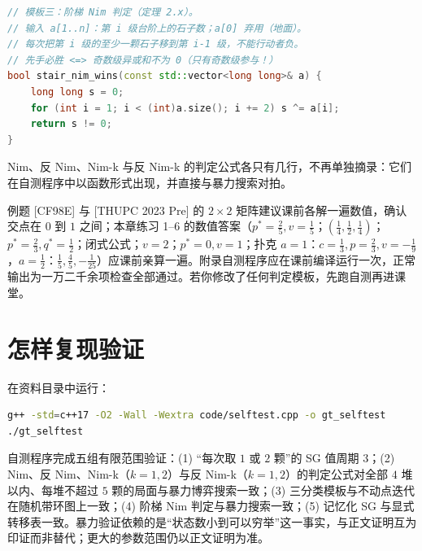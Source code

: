 \documentclass[UTF8,a4paper,11pt,oneside,openany,fontset=fandol]{ctexbook}
\theoremstyle{definition}
\begin{document}
\begin{lstlisting}[language=C++]
// 模板三：阶梯 Nim 判定（定理 2.x）。
// 输入 a[1..n]：第 i 级台阶上的石子数；a[0] 弃用（地面）。
// 每次把第 i 级的至少一颗石子移到第 i-1 级，不能行动者负。
// 先手必胜 <=> 奇数级异或和不为 0（只有奇数级参与！）
bool stair_nim_wins(const std::vector<long long>& a) {
    long long s = 0;
    for (int i = 1; i < (int)a.size(); i += 2) s ^= a[i];
    return s != 0;
}
\end{lstlisting}

Nim、反 Nim、Nim-k 与反 Nim-k 的判定公式各只有几行，不再单独摘录：它们在自测程序中以函数形式出现，并直接与暴力搜索对拍。

\begin{teach}[备课验证]
例题 [CF98E] 与 [THUPC 2023 Pre] 的 $2\times2$ 矩阵建议课前各解一遍数值，确认交点在 $0$ 到 $1$ 之间；本章练习 1--6 的数值答案（$p^{*}=\tfrac25,v=\tfrac15$；$(\tfrac14,\tfrac12,\tfrac14)$；$p^{*}=\tfrac23,q^{*}=\tfrac12$；闭式公式；$v=2$；$p^{*}=0,v=1$；扑克 $a=1$：$c=\tfrac13,p=\tfrac23,v=-\tfrac19$，$a=\tfrac12$：$\tfrac15,\tfrac45,-\tfrac1{25}$）应课前亲算一遍。附录自测程序应在课前编译运行一次，正常输出为一万二千余项检查全部通过。若你修改了任何判定模板，先跑自测再进课堂。
\end{teach}
\section{怎样复现验证}
在资料目录中运行：
\begin{lstlisting}[language=bash]
g++ -std=c++17 -O2 -Wall -Wextra code/selftest.cpp -o gt_selftest
./gt_selftest
\end{lstlisting}
自测程序完成五组有限范围验证：(1) “每次取 $1$ 或 $2$ 颗”的 SG 值周期 $3$；(2) Nim、反 Nim、Nim-k（$k=1,2$）与反 Nim-k（$k=1,2$）的判定公式对全部 $4$ 堆以内、每堆不超过 $5$ 颗的局面与暴力博弈搜索一致；(3) 三分类模板与不动点迭代在随机带环图上一致；(4) 阶梯 Nim 判定与暴力搜索一致；(5) 记忆化 SG 与显式转移表一致。暴力验证依赖的是“状态数小到可以穷举”这一事实，与正文证明互为印证而非替代；更大的参数范围仍以正文证明为准。
\end{document}
